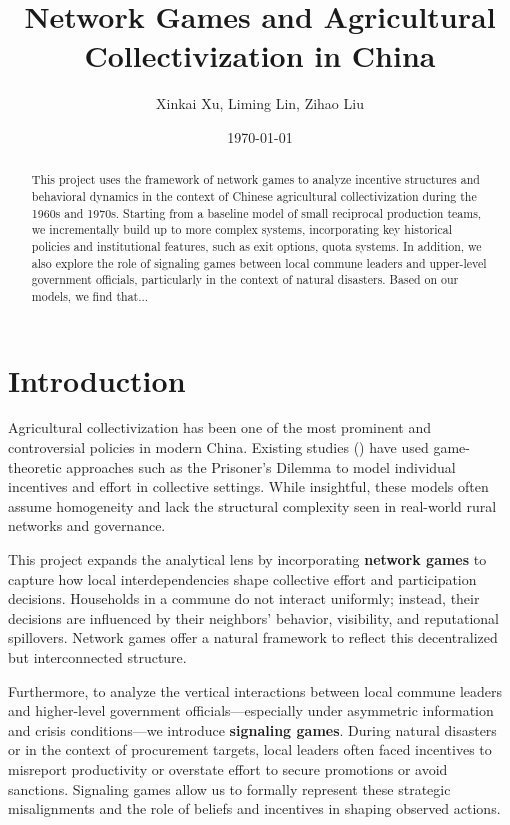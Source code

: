 \documentclass[12pt]{article}
\title{Network Games and Agricultural Collectivization in China}
\author{Xinkai Xu, Liming Lin, Zihao Liu}
\date{\today}
\begin{document}
\maketitle
\onehalfspacing

\begin{abstract}
This project uses the framework of network games to analyze incentive structures and behavioral dynamics in the context of Chinese agricultural collectivization during the 1960s and 1970s. Starting from a baseline model of small reciprocal production teams, we incrementally build up to more complex systems, incorporating key historical policies and institutional features, such as exit options, quota systems. In addition, we also explore the role of signaling games between local commune leaders and upper-level government officials, particularly in the context of natural disasters. Based on our models, we find that...
\end{abstract}

\section{Introduction}

Agricultural collectivization has been one of the most prominent and controversial policies in modern China. Existing studies (\cite{chinnDiligenceLazinessChinese1980, nitzanDiligenceLazinessChinese1987}) have used game-theoretic approaches such as the Prisoner’s Dilemma to model individual incentives and effort in collective settings. While insightful, these models often assume homogeneity and lack the structural complexity seen in real-world rural networks and governance.

This project expands the analytical lens by incorporating \textbf{network games} to capture how local interdependencies shape collective effort and participation decisions. Households in a commune do not interact uniformly; instead, their decisions are influenced by their neighbors' behavior, visibility, and reputational spillovers. Network games offer a natural framework to reflect this decentralized but interconnected structure.

Furthermore, to analyze the vertical interactions between local commune leaders and higher-level government officials—especially under asymmetric information and crisis conditions—we introduce \textbf{signaling games}. During natural disasters or in the context of procurement targets, local leaders often faced incentives to misreport productivity or overstate effort to secure promotions or avoid sanctions. Signaling games allow us to formally represent these strategic misalignments and the role of beliefs and incentives in shaping observed actions.
\end{document}
